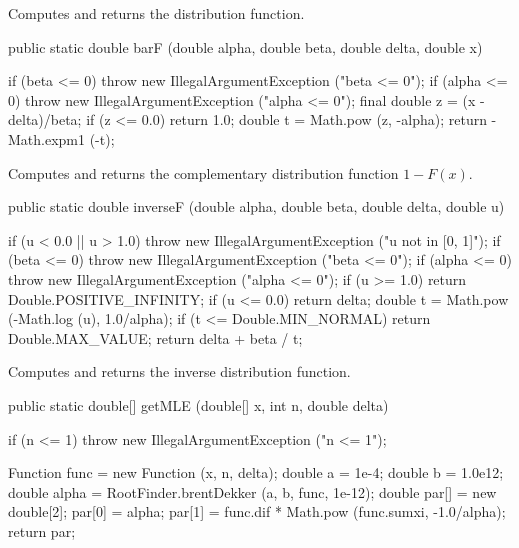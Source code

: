  \begin{tabb}
  Computes and returns  the distribution function.
 \end{tabb}
\begin{code}

   public static double barF (double alpha, double beta, double delta,
                              double x)\begin{hide} {
      if (beta <= 0)
         throw new IllegalArgumentException ("beta <= 0");
      if (alpha <= 0)
         throw new IllegalArgumentException ("alpha <= 0");
      final double z = (x - delta)/beta;
      if (z <= 0.0)
         return 1.0;
      double t = Math.pow (z, -alpha);
      return  -Math.expm1 (-t);
   }\end{hide}
\end{code}
 \begin{tabb}
  Computes and returns  the complementary distribution function $1 - F(x)$.
 \end{tabb}
\begin{code}

   public static double inverseF (double alpha, double beta, double delta,
                                  double u)\begin{hide} {
      if (u < 0.0 || u > 1.0)
         throw new IllegalArgumentException ("u not in [0, 1]");
      if (beta <= 0)
         throw new IllegalArgumentException ("beta <= 0");
      if (alpha <= 0)
         throw new IllegalArgumentException ("alpha <= 0");
      if (u >= 1.0)
         return Double.POSITIVE_INFINITY;
      if (u <= 0.0)
         return delta;
      double t = Math.pow (-Math.log (u), 1.0/alpha);
      if (t <= Double.MIN_NORMAL)
         return Double.MAX_VALUE;
      return delta + beta / t;
   }\end{hide}
\end{code}
  \begin{tabb}
  Computes and returns the inverse distribution function.
 \end{tabb}
\begin{code}

   public static double[] getMLE (double[] x, int n, double delta)\begin{hide} {
      if (n <= 1)
         throw new IllegalArgumentException ("n <= 1");

      Function func = new Function (x, n, delta);
      double a = 1e-4;
      double b = 1.0e12;
      double alpha = RootFinder.brentDekker (a, b, func, 1e-12);
      double par[] = new double[2];
      par[0] = alpha;
      par[1] = func.dif * Math.pow (func.sumxi, -1.0/alpha);
      return par;
   }\end{hide}
\end{code}
